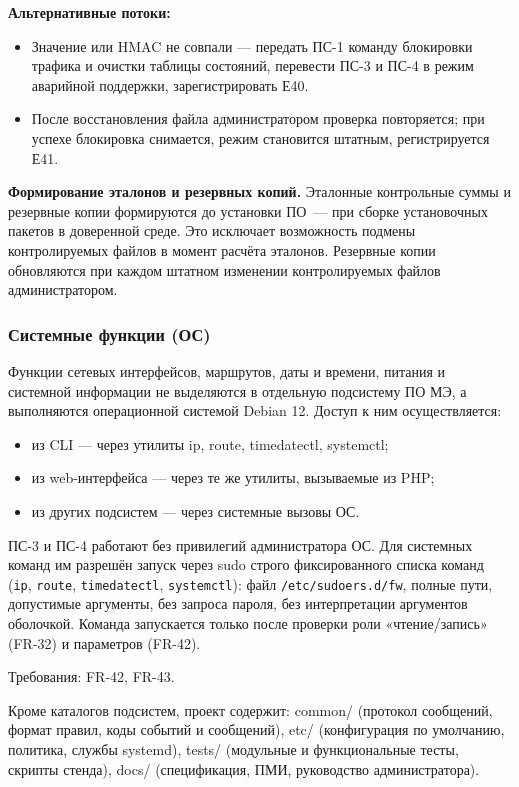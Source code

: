 \documentclass[13pt,a4paper,final]{article}
\begin{document}
\begin{enumerate}
		\textbf{Альтернативные потоки:}
		\begin{itemize}
			\item Значение или HMAC не совпали — передать ПС-1 команду блокировки трафика и очистки таблицы состояний, перевести ПС-3 и ПС-4 в режим аварийной поддержки, зарегистрировать Е40.
			\item После восстановления файла администратором проверка повторяется; при успехе блокировка снимается, режим становится штатным, регистрируется Е41.
		\end{itemize}
		
		\textbf{Формирование эталонов и резервных копий.} Эталонные контрольные суммы и резервные копии формируются \textcolor{edit}{до установки ПО~--- при сборке установочных пакетов в доверенной среде}. Это исключает возможность подмены контролируемых файлов в момент расчёта эталонов. Резервные копии обновляются при каждом штатном изменении контролируемых файлов администратором.
		
	\end{enumerate}
	\subsubsection{Системные функции (ОС)}
	
	Функции сетевых интерфейсов, маршрутов, даты и времени, питания и системной информации не выделяются в отдельную подсистему ПО МЭ, а выполняются операционной системой Debian 12. Доступ к ним осуществляется:
	\begin{itemize}
		\item из CLI — через утилиты ip, route, timedatectl, systemctl;
		\item из web-интерфейса — через те же утилиты, вызываемые из PHP;
		\item из других подсистем — через системные вызовы ОС.
	\end{itemize}
	
	ПС-3 и ПС-4 работают без привилегий администратора ОС. Для системных команд им разрешён запуск через sudo строго фиксированного списка команд (\texttt{ip}, \texttt{route}, \texttt{timedatectl}, \texttt{systemctl}): файл \texttt{/etc/sudoers.d/fw}, полные пути, допустимые аргументы, без запроса пароля, без интерпретации аргументов оболочкой. Команда запускается только после проверки роли «чтение/запись» (FR-32) и параметров (FR-42).
	
	Требования: FR-42, FR-43.
	
	Кроме каталогов подсистем, проект содержит: common/ (протокол сообщений, формат правил, коды событий и сообщений), etc/ (конфигурация по умолчанию, политика, службы systemd), tests/ (модульные и функциональные тесты, скрипты стенда), docs/ (спецификация, ПМИ, руководство администратора).
	
\end{document}
